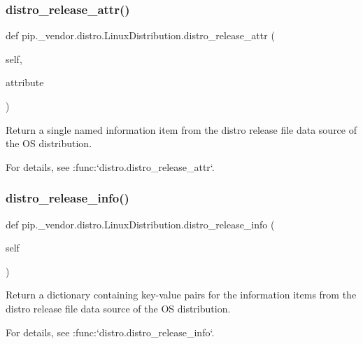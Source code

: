 \subsubsection{\texorpdfstring{distro\+\_\+release\+\_\+attr()}{distro\_release\_attr()}}
{\footnotesize\ttfamily def pip.\+\_\+vendor.\+distro.\+Linux\+Distribution.\+distro\+\_\+release\+\_\+attr (\begin{DoxyParamCaption}\item[{}]{self,  }\item[{}]{attribute }\end{DoxyParamCaption})}

\begin{DoxyVerb}Return a single named information item from the distro release file
data source of the OS distribution.

For details, see :func:`distro.distro_release_attr`.
\end{DoxyVerb}
 \mbox{\label{classpip_1_1__vendor_1_1distro_1_1LinuxDistribution_a1d9126e8fcc8d24aacdbeb300fa94424}} 
\subsubsection{\texorpdfstring{distro\+\_\+release\+\_\+info()}{distro\_release\_info()}}
{\footnotesize\ttfamily def pip.\+\_\+vendor.\+distro.\+Linux\+Distribution.\+distro\+\_\+release\+\_\+info (\begin{DoxyParamCaption}\item[{}]{self }\end{DoxyParamCaption})}

\begin{DoxyVerb}Return a dictionary containing key-value pairs for the information
items from the distro release file data source of the OS
distribution.

For details, see :func:`distro.distro_release_info`.
\end{DoxyVerb}
 \mbox{\label{classpip_1_1__vendor_1_1distro_1_1LinuxDistribution_a116be2692b0f408214126c823ce11add}} 
